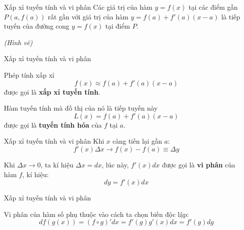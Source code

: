 \begin{frame}{Xấp xỉ tuyến tính và vi phân}
    Các giá trị của hàm $y=f(x)$ tại các điểm gần $P(a, f(a))$ rất gần với giá trị của hàm $y=f(a)+f'(a)(x-a)$ là tiếp tuyến của đường cong $y=f(x)$ tại điểm $P$.
    
    \textit{(Hình vẽ)}
\end{frame}
\begin{frame}{Xấp xỉ tuyến tính và vi phân}
    \begin{tcolorbox}[colback=blue!10, colframe=blue!50!black, title=Định nghĩa]
    Phép tính xấp xỉ
    \begin{equation}
        f(x)\approx f(a)+f'(a)(x-a)
    \end{equation}
    được gọi là \textbf{xấp xỉ tuyến tính}.

    Hàm tuyến tính mà đồ thị của nó là tiếp tuyến này
    \begin{equation}
        L(x)=f(a)+f'(a)(x-a)
    \end{equation}
    được gọi là \textbf{tuyến tính hóa} của $f$ tại $a$.
    \end{tcolorbox}
\end{frame}
\begin{frame}{Xấp xỉ tuyến tính và vi phân}
    Khi $x$ càng tiến lại gần $a$:
    \begin{equation}
        f'(x)\Delta x\longrightarrow f(x)-f(a) \equiv \Delta y
    \end{equation}
    \begin{tcolorbox}[colback=blue!10, colframe=blue!50!black, title=Định nghĩa]
    Khi $\Delta x\rightarrow0$, ta kí hiệu $\Delta x=dx$, lúc này, $f'(x)dx$ được gọi là \textbf{vi phân} của hàm $f$, kí hiệu:
    \begin{equation}
        dy=f'(x)dx
    \end{equation}
    \end{tcolorbox}{}
\end{frame}
\begin{frame}{Xấp xỉ tuyến tính và vi phân}
    \begin{tcolorbox}[colback=blue!10, colframe=blue!50!black, title=Định lý]
    Vi phân của hàm số phụ thuộc vào cách ta chọn biến độc lập:
    \begin{equation}
        df(g(x))=(f\circ g)'dx=f'(g)g'(x)dx=f'(g)dg
    \end{equation}
    \end{tcolorbox}
\end{frame}